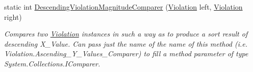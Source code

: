 \begin{DoxyCompactItemize}
static int \mbox{\hyperlink{class_c_s_i_1_1_library_1_1_array_utilities_1_1_array_limit_checks_1_1_violation_a70554b24254c91c11e3eb63ba75f902c}{Descending\+Violation\+Magnitude\+Comparer}} (\mbox{\hyperlink{class_c_s_i_1_1_library_1_1_array_utilities_1_1_array_limit_checks_1_1_violation}{Violation}} left, \mbox{\hyperlink{class_c_s_i_1_1_library_1_1_array_utilities_1_1_array_limit_checks_1_1_violation}{Violation}} right)
\begin{DoxyCompactList}\small\item\em Compares two \mbox{\hyperlink{class_c_s_i_1_1_library_1_1_array_utilities_1_1_array_limit_checks_1_1_violation}{Violation}} instances in such a way as to produce a sort result of descending X\+\_\+\+Value. Can pass just the name of the name of this method (i.\+e. Violation.\+Ascending\+\_\+\+Y\+\_\+\+Values\+\_\+\+Comparer) to fill a method parameter of type System.\+Collections.\+I\+Comparer. \end{DoxyCompactList}\end{DoxyCompactItemize}
